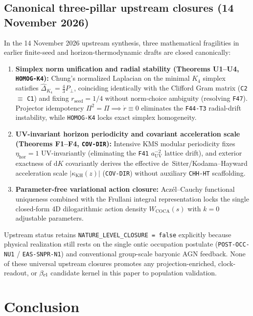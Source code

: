 \documentclass[11pt]{article}
\begin{document}
\subsection{Canonical three-pillar upstream closures (14 November 2026)}
\label{sec:three-pillar-closures-20261114}
In the 14 November 2026 upstream synthesis, three mathematical fragilities in
earlier finite-seed and horizon-thermodynamic drafts are closed canonically:
\begin{enumerate}[leftmargin=*]
\item \textbf{Simplex norm unification and radial stability (Theorems U1--U4, \texttt{HOMOG-K4}):}
Chung's normalized Laplacian on the minimal $K_4$ simplex satisfies
$\widehat{\Delta}_{K_4}=\frac{4}{3}P_\perp$, coinciding identically with the
Clifford Gram matrix (\texttt{C2} $\equiv$ \texttt{C1}) and fixing
$r_{\mathrm{seed}}=1/4$ without norm-choice ambiguity (resolving \texttt{F47}).
Projector idempotency $\Pi^2=\Pi\implies\dot{r}\equiv 0$ eliminates the
\texttt{F44-T3} radial-drift instability, while \texttt{HOMOG-K4} locks exact
simplex homogeneity.
\item \textbf{UV-invariant horizon periodicity and covariant acceleration scale (Theorems F1--F4, \texttt{COV-DIR}):}
Intensive KMS modular periodicity fixes $\eta_{\mathrm{hor}}=1$
UV-invariantly (eliminating the \texttt{F41} $a_{\mathrm{UV}}^{-2}$ lattice
drift), and exterior exactness of $\mathrm{d}K$ covariantly derives the
effective de~Sitter/Kodama--Hayward acceleration scale
$|\kappa_{\mathrm{KH}}(z)|$ (\texttt{COV-DIR}) without auxiliary
\texttt{CHH-HT} scaffolding.
\item \textbf{Parameter-free variational action closure:}
Acz\'el--Cauchy functional uniqueness combined with the Frullani integral
representation locks the single closed-form 4D dilogarithmic action density
$W_{\mathrm{COCA}}(s)$ with $k=0$ adjustable parameters.
\end{enumerate}
Upstream status retains \texttt{NATURE\_LEVEL\_CLOSURE = false} explicitly
because physical realization still rests on the single ontic occupation
postulate (\texttt{POST-OCC-NU1} / \texttt{EAS-SNPR-N1}) and conventional
group-scale baryonic AGN feedback. None of these universal upstream closures
promotes any projection-enriched, clock-readout, or $\beta_{\rm cl}$ candidate
kernel in this paper to population validation.

\section{Conclusion}
\end{document}

